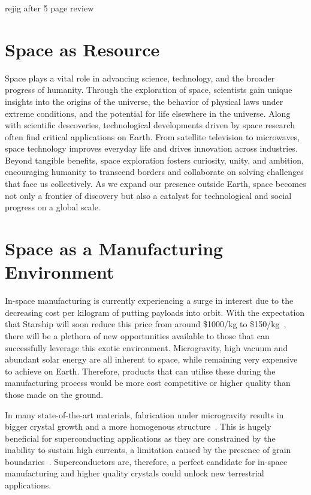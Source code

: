 rejig after 5 page review

\section{Space as Resource}
Space plays a vital role in advancing science, technology, and the broader progress of humanity. Through the exploration of space, scientists gain unique insights into the origins of the universe, the behavior of physical laws under extreme conditions, and the potential for life elsewhere in the universe. Along with scientific descoveries, technological developments driven by space research often find critical applications on Earth. From satellite television to microwaves, space technology improves everyday life and drives innovation across industries. Beyond tangible benefits, space exploration fosters curiosity, unity, and ambition, encouraging humanity to transcend borders and collaborate on solving challenges that face us collectively. As we expand our presence outside Earth, space becomes not only a frontier of discovery but also a catalyst for technological and social progress on a global scale.

\section{Space as a Manufacturing Environment}
In-space manufacturing is currently experiencing a surge in interest due to the decreasing cost per kilogram of putting payloads into orbit. With the expectation that Starship will soon reduce this price from around \$1000/kg to \$150/kg~\cite{nextbigfuture2024spacex}, there will be a plethora of new opportunities available to those that can successfully leverage this exotic environment. Microgravity, high vacuum and abundant solar energy are all inherent to space, while remaining very expensive to achieve on Earth. Therefore, products that can utilise these during the manufacturing process would be more cost competitive or higher quality than those made on the ground.

In many state-of-the-art materials, fabrication under microgravity results in bigger crystal growth and a more homogenous structure~\cite{issnll_mccg}. This is hugely beneficial for superconducting applications as they are constrained by the inability to sustain high currents, a limitation caused by the presence of grain boundaries~\cite{hilgenkamp2002grain}. Superconductors are, therefore, a perfect candidate for in-space manufacturing and higher quality crystals could unlock new terrestrial applications.

